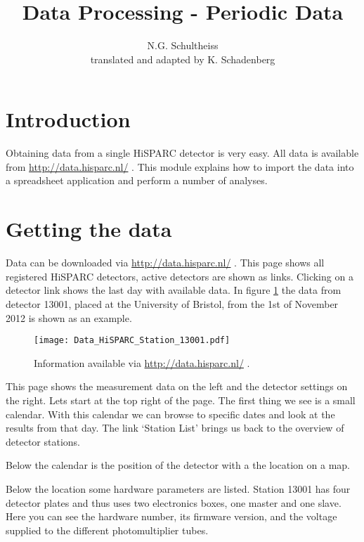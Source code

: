 


\author{N.G. Schultheiss \\ translated and adapted by K. Schadenberg}
\date{}
\title{Data Processing - Periodic Data}



\maketitle

\section{Introduction}
Obtaining data from a single HiSPARC detector is very easy. All data is available from \url{http://data.hisparc.nl/} . This module explains how to import the data into a spreadsheet application and perform a number of analyses.

\section{Getting the data}
Data can be downloaded via \url{http://data.hisparc.nl/} . This page shows all registered HiSPARC detectors, active detectors are shown as links. Clicking on a detector link shows the last day with available data. In figure \ref{fig:data_screen} the data from detector 13001, placed at the University of Bristol, from the 1st of November 2012 is shown as an example.

\begin{figure}\begin{center}
\texttt{[image: Data\_HiSPARC\_Station\_13001.pdf]}
\caption{Information available via \protect\url{http://data.hisparc.nl/} .}\label{fig:data_screen}
\end{center}\end{figure}

This page shows the measurement data on the left and the detector settings on the right. Lets start at the top right of the page. The first thing we see is a small calendar. With this calendar we can browse to specific dates and look at the results from that day. The link `Station List' brings us back to the overview of detector stations.

Below the calendar is the position of the detector with a the location on a map.

Below the location some hardware parameters are listed. Station 13001 has four detector plates and thus uses two electronics boxes, one master and one slave. Here you can see the hardware number, its firmware version, and the voltage supplied to the different photomultiplier tubes.

